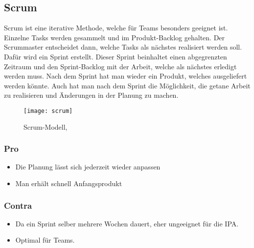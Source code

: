 \subsection{Scrum}
Scrum ist eine iterative Methode, welche für Teams besonders geeignet ist. Einzelne Tasks werden gesammelt und im Produkt-Backlog gehalten. Der Scrummaster entscheidet dann, welche Tasks als nächstes realisiert werden soll. Dafür wird ein Sprint erstellt. Dieser Sprint beinhaltet einen abgegrenzten Zeitraum und den Sprint-Backlog mit der Arbeit, welche als nächstes erledigt werden muss. Nach dem Sprint hat man wieder ein Produkt, welches ausgeliefert werden könnte. Auch hat man nach dem Sprint die Möglichkeit, die getane Arbeit zu realisieren und Änderungen in der Planung zu machen.
\begin{figure}[H]
	\centering
	\texttt{[image: scrum]}
	\caption{Scrum-Modell, \protect{}}
\end{figure}
\subsubsection{Pro}
\begin{itemize}
\item Die Planung lässt sich jederzeit wieder anpassen
\item Man erhält schnell Anfangsprodukt
\end{itemize}
\subsubsection{Contra}
\begin{itemize}
\item Da ein Sprint selber mehrere Wochen dauert, eher ungeeignet für die IPA.
\item Optimal für Teams.
\end{itemize}

